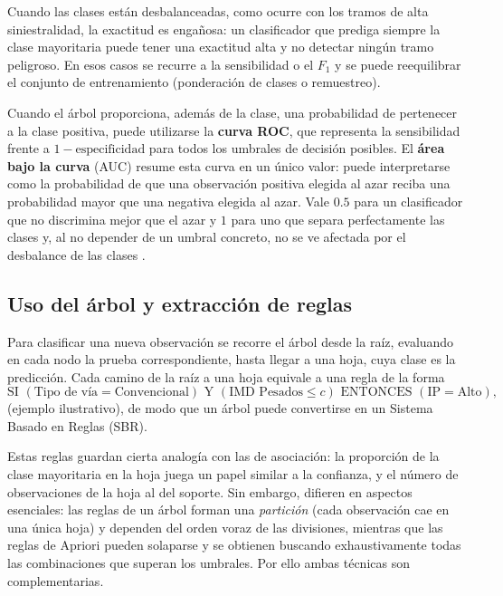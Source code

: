 \documentclass[twoside,a4paper,12pt,onecolumn,openany]{book}
\begin{document}
Cuando las clases están desbalanceadas, como ocurre con los tramos de alta siniestralidad, la exactitud es engañosa: un clasificador que prediga siempre la clase mayoritaria puede tener una exactitud alta y no detectar ningún tramo peligroso. En esos casos se recurre a la sensibilidad o el $F_1$  y se puede reequilibrar el conjunto de entrenamiento (ponderación de clases o remuestreo).

\vspace{0.5cm}

Cuando el árbol proporciona, además de la clase, una probabilidad de pertenecer a la clase positiva, puede utilizarse la \textbf{curva ROC}, que representa la sensibilidad frente a $1-\text{especificidad}$ para todos los umbrales de decisión posibles. El \textbf{área bajo la curva} (AUC) resume esta curva en un único valor: puede interpretarse como la probabilidad de que una observación positiva elegida al azar reciba una probabilidad mayor que una negativa elegida al azar. Vale $0.5$ para un clasificador que no discrimina mejor que el azar y $1$ para uno que separa perfectamente las clases y, al no depender de un umbral concreto, no se ve afectada por el desbalance de las clases \cite{tema3_clasificacion}.
 
\subsection{Uso del árbol y extracción de reglas}
 
Para clasificar una nueva observación se recorre el árbol desde la raíz, evaluando en cada nodo la prueba correspondiente, hasta llegar a una hoja, cuya clase es la predicción. Cada camino de la raíz a una hoja equivale a una regla de la forma
\[
\text{SI } (\text{Tipo de vía}=\text{Convencional}) \text{ Y } (\text{IMD Pesados}\leq c) \text{ ENTONCES } (\text{IP}=\text{Alto}),
\]
(ejemplo ilustrativo), de modo que un árbol puede convertirse en un Sistema Basado en Reglas (SBR).
 
\vspace{0.5cm}
 
Estas reglas guardan cierta analogía con las de asociación: la proporción de la clase mayoritaria en la hoja juega un papel similar a la confianza, y el número de observaciones de la hoja al del soporte. Sin embargo, difieren en aspectos esenciales: las reglas de un árbol forman una \textit{partición} (cada observación cae en una única hoja) y dependen del orden voraz de las divisiones, mientras que las reglas de Apriori pueden solaparse y se obtienen buscando exhaustivamente todas las combinaciones que superan los umbrales. Por ello ambas técnicas son complementarias.
 
\end{document}

